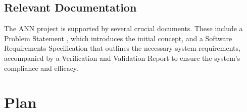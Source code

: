 \documentclass[12pt, titlepage]{article}
\begin{document}



\subsection{Relevant Documentation}

The ANN project is supported by several crucial documents. 
These include a
Problem Statement \citep{ProblemStatement}, which introduces the initial concept, and a 
Software Requirements Specification \citep{SRS} that outlines the necessary system requirements, accompanied 
by a Verification and Validation Report \citep{VnVReport} to ensure the system's compliance and efficacy.




\section{Plan}\label{Plan}
\end{document}
